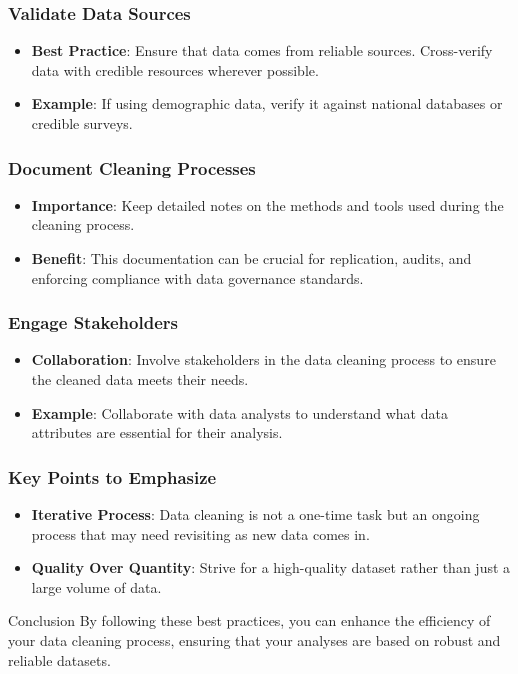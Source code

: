 \documentclass[aspectratio=169]{beamer}
\begin{document}
\begin{frame}[fragile]
    \frametitle{Validate Data Sources}
    \begin{itemize}
        \item \textbf{Best Practice}: 
        Ensure that data comes from reliable sources. Cross-verify data with credible resources wherever possible.
        \item \textbf{Example}: 
        If using demographic data, verify it against national databases or credible surveys.
    \end{itemize}
\end{frame}

\begin{frame}[fragile]
    \frametitle{Document Cleaning Processes}
    \begin{itemize}
        \item \textbf{Importance}: 
        Keep detailed notes on the methods and tools used during the cleaning process.
        \item \textbf{Benefit}: 
        This documentation can be crucial for replication, audits, and enforcing compliance with data governance standards.
    \end{itemize}
\end{frame}

\begin{frame}[fragile]
    \frametitle{Engage Stakeholders}
    \begin{itemize}
        \item \textbf{Collaboration}: 
        Involve stakeholders in the data cleaning process to ensure the cleaned data meets their needs.
        \item \textbf{Example}: 
        Collaborate with data analysts to understand what data attributes are essential for their analysis.
    \end{itemize}
\end{frame}

\begin{frame}[fragile]
    \frametitle{Key Points to Emphasize}
    \begin{itemize}
        \item \textbf{Iterative Process}: 
        Data cleaning is not a one-time task but an ongoing process that may need revisiting as new data comes in.
        \item \textbf{Quality Over Quantity}: 
        Strive for a high-quality dataset rather than just a large volume of data.
    \end{itemize}
    \begin{block}{Conclusion}
        By following these best practices, you can enhance the efficiency of your data cleaning process, ensuring that your analyses are based on robust and reliable datasets.
    \end{block}
\end{frame}
\end{document}
